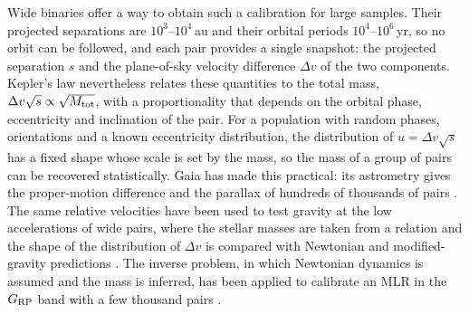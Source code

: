 \documentclass{aa}
\begin{document}

Wide binaries offer a way to obtain such a calibration for large samples. Their projected separations are $10^3$--$10^4$\,au and their orbital periods $10^4$--$10^6$\,yr, so no orbit can be followed, and each pair provides a single snapshot: the projected separation $s$ and the plane-of-sky velocity difference $\Delta v$ of the two components. Kepler's law nevertheless relates these quantities to the total mass, $\Delta v\sqrt{s}\propto\sqrt{M_{\rm tot}}$, with a proportionality that depends on the orbital phase, eccentricity and inclination of the pair. For a population with random phases, orientations and a known eccentricity distribution, the distribution of $u=\Delta v\sqrt{s}$ has a fixed shape whose scale is set by the mass, so the mass of a group of pairs can be recovered statistically. Gaia has made this practical: its astrometry gives the proper-motion difference and the parallax of hundreds of thousands of pairs \citep{ElBadry2021MillionBinaries}. The same relative velocities have been used to test gravity at the low accelerations of wide pairs, where the stellar masses are taken from a relation and the shape of the distribution of $\Delta v$ is compared with Newtonian and modified-gravity predictions \citep{Hernandez2012,Chae2023,Banik2024}. The inverse problem, in which Newtonian dynamics is assumed and the mass is inferred, has been applied to calibrate an MLR in the $G_{\rm RP}$ band with a few thousand pairs \citep{Giovinazzi2022}. 
\end{document}
